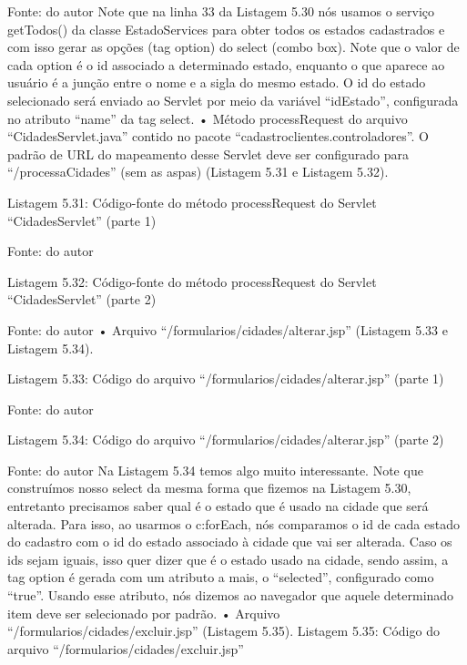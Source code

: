 Fonte: do autor
Note que na linha 33 da Listagem 5.30 nós usamos o serviço getTodos() da classe EstadoServices para obter todos os estados cadastrados e com isso gerar as opções (tag option) do select (combo box). Note que o valor de cada option é o id associado a determinado estado, enquanto o que aparece ao usuário é a junção entre o nome e a sigla do mesmo estado. O id do estado selecionado será enviado ao Servlet por meio da variável “idEstado”, configurada no atributo “name” da tag select.
•	Método processRequest do arquivo “CidadesServlet.java” contido no pacote “cadastroclientes.controladores”. O padrão de URL do mapeamento desse Servlet deve ser configurado para “/processaCidades” (sem as aspas) (Listagem 5.31 e Listagem 5.32).



















Listagem 5.31: Código-fonte do método processRequest do Servlet “CidadesServlet” (parte 1)
 
Fonte: do autor



Listagem 5.32: Código-fonte do método processRequest do Servlet “CidadesServlet” (parte 2)
 
Fonte: do autor
•	Arquivo “/formularios/cidades/alterar.jsp” (Listagem 5.33 e Listagem 5.34).


Listagem 5.33: Código do arquivo “/formularios/cidades/alterar.jsp” (parte 1)
 
Fonte: do autor










Listagem 5.34: Código do arquivo “/formularios/cidades/alterar.jsp” (parte 2)
 
Fonte: do autor
Na Listagem 5.34 temos algo muito interessante. Note que construímos nosso select da mesma forma que fizemos na Listagem 5.30, entretanto precisamos saber qual é o estado que é usado na cidade que será alterada. Para isso, ao usarmos o c:forEach, nós comparamos o id de cada estado do cadastro com o id do estado associado à cidade que vai ser alterada. Caso os ids sejam iguais, isso quer dizer que é o estado usado na cidade, sendo assim, a tag option é gerada com um atributo a mais, o “selected”, configurado como “true”. Usando esse atributo, nós dizemos ao navegador que aquele determinado item deve ser selecionado por padrão.
•	Arquivo “/formularios/cidades/excluir.jsp” (Listagem 5.35).
Listagem 5.35: Código do arquivo “/formularios/cidades/excluir.jsp”
 
